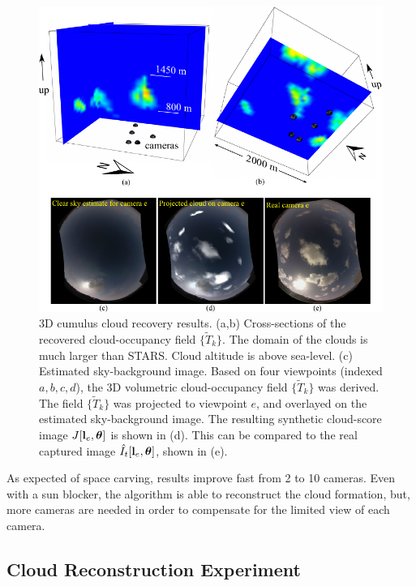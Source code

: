 \documentclass[runningheads]{llncs}
\begin{document}
\begin{figure}[h!]
\begin{center}
   \includegraphics[width=0.95\linewidth]{clouds_reconstructions.pdf}
\end{center}
   \vspace{-0.6cm}
   \caption{3D cumulus cloud recovery results. (a,b) Cross-sections of the recovered cloud-occupancy field $\{\tilde T_k\}$. The domain of the clouds is much larger than STARS. Cloud
   altitude is above sea-level. (c) Estimated sky-background image.  Based on four viewpoints (indexed $a,b,c,d$), the 3D volumetric cloud-occupancy field $\{\tilde T_k\}$ was derived. The field $\{\tilde T_k\}$ was projected to viewpoint $e$, and overlayed on the estimated sky-background image. The resulting synthetic cloud-score image $J[{\bf l}_e,{\bm \theta}]$ is shown in (d). This can be compared to the real captured image $\hat I_t[{\bf l}_e,{\bm \theta}]$, shown in (e).}
\label{fig:projection}
\end{figure}
As expected of space carving,
results improve fast from 2 to 10 cameras. Even with a sun blocker,
the algorithm is able to reconstruct the cloud formation, but, more cameras are needed in order to compensate for the limited view of
each camera.


\subsection*{Cloud Reconstruction Experiment}
\label{sec:results}
\end{document}
